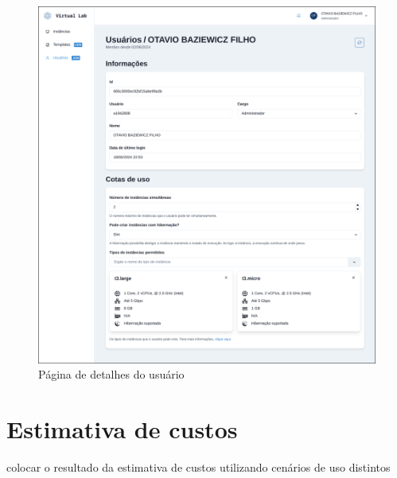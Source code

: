 \begin{figure}[H]
\caption{Página de detalhes do usuário}
\label{fig:userDetails}
\includegraphics[width=\textwidth]{capitulos/3-resultados/files/user-page.png}
\end{figure}

\section{Estimativa de custos}
\label{sec:estimativaDeCustos}

colocar o resultado da estimativa de custos utilizando cenários de uso distintos

